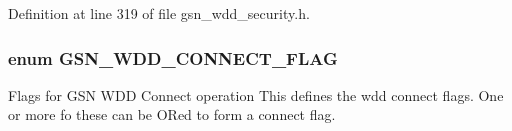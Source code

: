 Definition at line 319 of file gsn\_\-wdd\_\-security.h.

\hypertarget{a00677_ga2846a7c5251eb6332e71299cef92d003}{
\subsubsection[{GSN\_\-WDD\_\-CONNECT\_\-FLAG}]{\setlength{\rightskip}{0pt plus 5cm}enum {\bf GSN\_\-WDD\_\-CONNECT\_\-FLAG}}}
\label{a00677_ga2846a7c5251eb6332e71299cef92d003}


Flags for GSN WDD Connect operation This defines the wdd connect flags. One or more fo these can be ORed to form a connect flag. 

